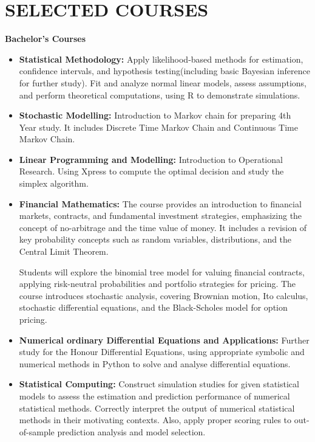 \documentclass[a4paper,9pt]{extarticle}
\begin{document}
\section*{SELECTED COURSES}
\noindent
\textbf{Bachelor's Courses}
\begin{itemize}
\item \textbf{Statistical Methodology:} Apply likelihood-based methods for estimation, confidence intervals, and hypothesis testing(including basic Bayesian inference for further study). Fit and analyze normal linear models, assess assumptions, and perform theoretical computations, using R to demonstrate simulations.

\item \textbf{Stochastic Modelling:}  Introduction to Markov chain for preparing 4th Year study. It includes Discrete Time Markov Chain and Continuous Time Markov Chain.

\item \textbf{Linear Programming and Modelling:} Introduction to Operational Research. Using Xpress to compute the optimal decision and study the simplex algorithm.

\item \textbf{Financial Mathematics:} The course provides an introduction to financial markets, contracts, and fundamental investment strategies, emphasizing the concept of no-arbitrage and the time value of money. It includes a revision of key probability concepts such as random variables, distributions, and the Central Limit Theorem.

Students will explore the binomial tree model for valuing financial contracts, applying risk-neutral probabilities and portfolio strategies for pricing. The course introduces stochastic analysis, covering Brownian motion, Ito calculus, stochastic differential equations, and the Black-Scholes model for option pricing.

\item \textbf{Numerical ordinary Differential Equations and Applications:} Further study for the Honour Differential Equations, using appropriate symbolic and numerical methods in Python to solve and analyse differential equations. 


\item \textbf{Statistical Computing:}
Construct simulation studies for given statistical models to assess the estimation and prediction performance of numerical statistical methods. Correctly interpret the output of numerical statistical methods in their motivating contexts. Also, apply proper scoring rules to out-of-sample prediction analysis and model selection.
\end{itemize}
\end{document}
